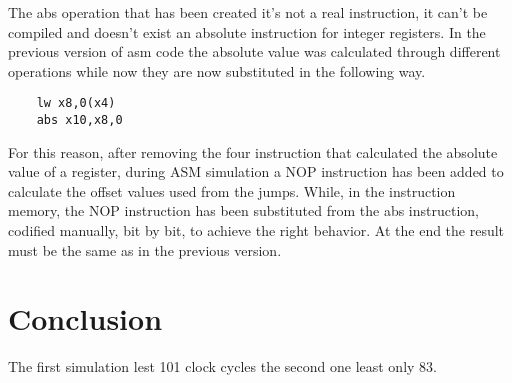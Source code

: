 The abs operation that has been created it's not a real instruction, it can't be compiled and doesn't exist
an absolute instruction for integer registers. In the previous version of asm code the absolute value was calculated 
through different operations while now they are now substituted in the following way.

\begin{lstlisting}
    lw x8,0(x4)      
    abs x10,x8,0
\end{lstlisting}

For this reason, after removing the four instruction that calculated
the absolute value of a register, during ASM simulation a NOP instruction has been added to calculate the
offset values used from the jumps. While, in the instruction memory, the NOP instruction has been substituted from 
the abs instruction, codified manually, bit by bit, to achieve the right behavior.
At the end the result must be the same as in the previous version.


\section{Conclusion}

The first simulation lest 101 clock cycles the second one least only 83.